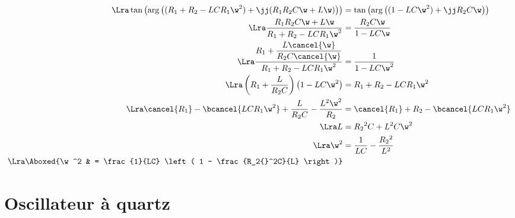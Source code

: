 \documentclass[a4paper, 12pt, final, garamond]{book}
\begin{document}
{\begin{align*}
		\Lra
		\tan \left(\arg \left( (R_1 + R_2 - LCR_1\w^2) + \jj(R_1R_2C\w + L\w) \right)\right)
		 & = \tan\left(\arg \left( (1-LC\w^2) + \jj R_2C\w \right)\right) \\
		\Lra
		\frac{R_1R_2C\w + L\w}{R_1 + R_2 - LCR_1\w^2}
		 & = \frac{R_2C\w}{1-LC\w}                                        \\
		\Lra
		\frac{R_1 + \dfrac{L\cancel{\w}}{R_2C\cancel{\w}}}{R_1 + R_2 - LCR_1\w^2}
		 & = \frac{1}{1-LC\w^2}                                           \\
		\Lra
		\left( R_1 + \frac{L}{R_2C} \right) \left( 1-LC\w^2 \right)
		 & = R_1 + R_2 - LCR_1\w^2                                        \\
		\Lra
		\cancel{R_1} - \bcancel{LCR_1\w^2} + \frac{L}{R_2C} - \frac{L^2\w^2}{R_2}
		 & = \cancel{R_1} + R_2 - \bcancel{LCR_1\w^2}                     \\
		\Lra
		L
		 & = R_2{}^2 C + L^2C\w^2                                         \\
		\Lra
		\w^2
		 & = \frac{1}{LC} - \frac{R_2{}^2}{L^2}                           \\
		\Lra
		\Aboxed{\w^2
		 & = \frac{1}{LC} \left( 1 - \frac{R_2{}^2C}{L} \right)}
	\end{align*}
}

\resetQ
\section{Oscillateur à quartz}
\end{document}
